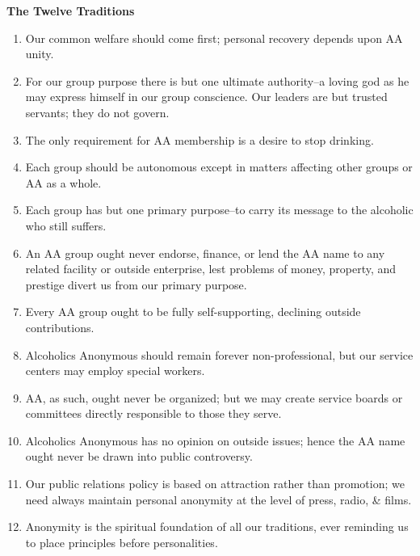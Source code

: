 \documentclass{beamer}
\begin{document}
\begin{frame}[plain]\scriptsize
\textcolor{example}{\textbf{The Twelve Traditions}}
\begin{enumerate}%
\item Our  common  welfare  should  come  first;  personal  recovery  depends upon AA unity. \item   For our group purpose there is but one ultimate authority--a loving  god  as  he  may  express  himself  in  our  group  conscience.  Our  leaders  are  but  trusted  servants;  they  do  not  govern.\item   The  only  requirement  for  AA  membership  is  a  desire  to  stop drinking. \item   Each group should be autonomous except in matters affecting other groups or AA as a whole. \item  Each  group  has  but  one  primary  purpose--to  carry  its  message to the alcoholic who still suffers. \item   An  AA  group  ought  never  endorse,  finance,  or  lend  the  AA  name  to  any  related  facility  or  outside  enterprise,  lest  problems  of  money,  property,  and  prestige  divert  us  from  our primary purpose. \item   Every AA group ought to be fully self-supporting, declining outside contributions. \item     Alcoholics     Anonymous     should     remain     forever          non-professional, but our service centers may employ special workers. \item    AA,  as  such,  ought  never  be  organized;  but  we  may  create  service  boards  or  committees  directly  responsible  to  those  they serve. \item  Alcoholics  Anonymous  has  no  opinion  on  outside  issues;  hence  the  AA  name  ought  never  be  drawn  into  public  controversy. \item Our public relations policy is based on attraction rather than promotion;  we  need  always  maintain  personal  anonymity  at  the level of press, radio, \& films. \item  Anonymity  is  the  spiritual  foundation  of  all  our  traditions,  ever reminding us to place principles before personalities. 
\end{enumerate}
\end{frame}
\end{document}
